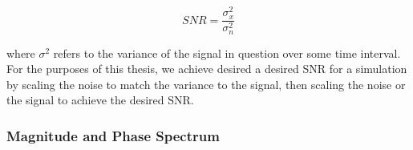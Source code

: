 \begin{equation}
SNR = \dfrac{\sigma_{x}^2}{\sigma_{n}^2}
\end{equation}

where $\sigma^{2}$ refers to the variance of the signal in question over some time interval. For the purposes of this thesis, we achieve desired a desired SNR for a simulation by scaling the noise to match the variance to the signal, then scaling the noise or the signal to achieve the desired SNR. %

\subsubsection{Magnitude and Phase Spectrum}

